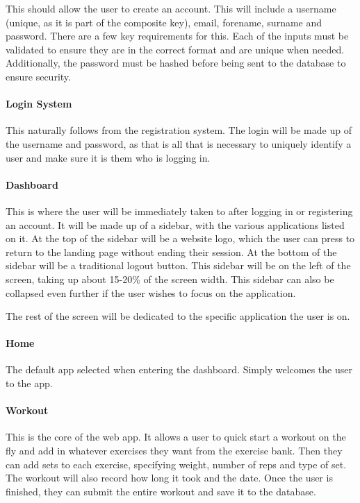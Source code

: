 \documentclass{article}
\begin{document}
This should allow the user to create an account. This will include a username (unique, as it is part of the composite key), email, forename, surname and password. There are a few key requirements for this. Each of the inputs must be validated to ensure they are in the correct format and are unique when needed. Additionally, the password must be hashed before being sent to the database to ensure security. 

\paragraph{Login System}

This naturally follows from the registration system. The login will be made up of the username and password, as that is all that is necessary to uniquely identify a user and make sure it is them who is logging in. 

\paragraph{Dashboard}

This is where the user will be immediately taken to after logging in or registering an account. It will be made up of a sidebar, with the various applications listed on it. At the top of the sidebar will be a website logo, which the user can press to return to the landing  page without ending their session. At the bottom of the sidebar will be a traditional logout button. This sidebar will be on the left of the screen, taking up about 15-20\% of the screen width. This sidebar can also be collapsed even further if the user wishes to focus on the application. 

The rest of the screen will be dedicated to the specific application the user is on.

\paragraph{Home}

The default app selected when entering the dashboard. Simply welcomes the user to the app.

\paragraph{Workout}

This is the core of the web app. It allows a user to quick start a workout on the fly and add in whatever exercises they want from the exercise bank. Then they can add sets to each exercise, specifying weight, number of reps and type of set. The workout will also record how long it took and the date. Once the user is finished, they can submit the entire workout and save it to the database.
\end{document}
